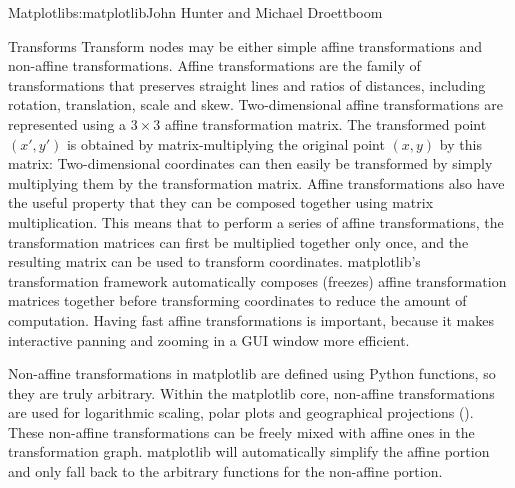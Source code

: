 \begin{aosachapter}{Matplotlib}{s:matplotlib}{John Hunter and Michael Droettboom}
\begin{aosasect1}{Transforms}
Transform nodes may be either simple affine transformations and
non-affine transformations.  Affine transformations are the family of
transformations that preserves straight lines and ratios of distances,
including rotation, translation, scale and skew.  Two-dimensional
affine transformations are represented using a $3 \times 3$ affine
transformation matrix.  The transformed point $(x\prime, y\prime)$ is
obtained by matrix-multiplying the original point $(x, y)$ by this
matrix:
Two-dimensional coordinates can then easily be transformed by simply
multiplying them by the transformation matrix.  Affine transformations
also have the useful property that they can be composed together using
matrix multiplication.  This means that to perform a series of affine
transformations, the transformation matrices can first be multiplied
together only once, and the resulting matrix can be used to transform
coordinates.  matplotlib's transformation framework automatically
composes (freezes) affine transformation matrices together before
transforming coordinates to reduce the amount of computation.  Having
fast affine transformations is important, because it makes interactive
panning and zooming in a GUI window more efficient.

Non-affine transformations in matplotlib are defined using Python
functions, so they are truly arbitrary.  Within the matplotlib core,
non-affine transformations are used for logarithmic scaling, polar
plots and geographical projections ().
These non-affine transformations can be freely mixed with affine ones
in the transformation graph.  matplotlib will automatically simplify
the affine portion and only fall back to the arbitrary functions for
the non-affine portion.


\end{aosasect1}
\end{aosachapter}
